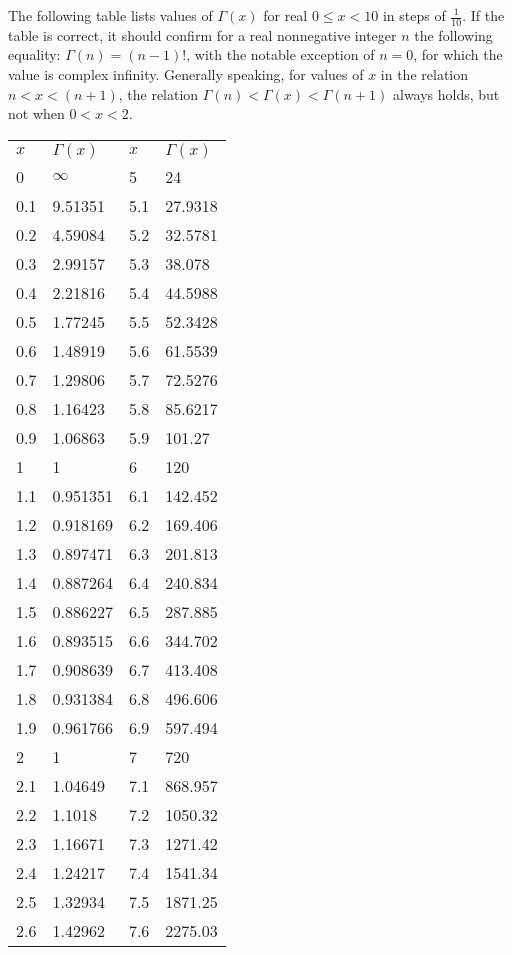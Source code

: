 \documentclass[12pt]{article}
\begin{document}
The following table lists values of $\Gamma(x)$ for real $0 \leq x < 10$ in steps of $\frac{1}{10}$. If the table is correct, it should confirm for a real nonnegative integer $n$ the following equality: $\Gamma(n) = (n - 1)!$, with the notable exception of $n = 0$, for which the value is complex infinity. Generally speaking, for values of $x$ in the relation $n < x < (n + 1)$, the relation $\Gamma(n) < \Gamma(x) < \Gamma(n + 1)$ always holds, but not when $0 < x < 2$.

\begin{tabular}{|l|l|l|l|}
$x$ & $\Gamma(x)$ & $x$ & $\Gamma(x)$ \\
0 & $\infty$ & 5 & 24 \\
0.1 & 9.51351 & 5.1 & 27.9318 \\
0.2 & 4.59084 & 5.2 & 32.5781 \\
0.3 & 2.99157 & 5.3 & 38.078 \\
0.4 & 2.21816 & 5.4 & 44.5988 \\
0.5 & 1.77245 & 5.5 & 52.3428 \\
0.6 & 1.48919 & 5.6 & 61.5539 \\
0.7 & 1.29806 & 5.7 & 72.5276 \\
0.8 & 1.16423 & 5.8 & 85.6217 \\
0.9 & 1.06863 & 5.9 & 101.27 \\
1 & 1 & 6 & 120 \\
1.1 & 0.951351 & 6.1 & 142.452 \\
1.2 & 0.918169 & 6.2 & 169.406 \\
1.3 & 0.897471 & 6.3 & 201.813 \\
1.4 & 0.887264 & 6.4 & 240.834 \\
1.5 & 0.886227 & 6.5 & 287.885 \\
1.6 & 0.893515 & 6.6 & 344.702 \\
1.7 & 0.908639 & 6.7 & 413.408 \\
1.8 & 0.931384 & 6.8 & 496.606 \\
1.9 & 0.961766 & 6.9 & 597.494 \\
2 & 1 & 7 & 720 \\
2.1 & 1.04649 & 7.1 & 868.957 \\
2.2 & 1.1018 & 7.2 & 1050.32 \\
2.3 & 1.16671 & 7.3 & 1271.42 \\
2.4 & 1.24217 & 7.4 & 1541.34 \\
2.5 & 1.32934 & 7.5 & 1871.25 \\
2.6 & 1.42962 & 7.6 & 2275.03 \\

\end{tabular}
\end{document}
